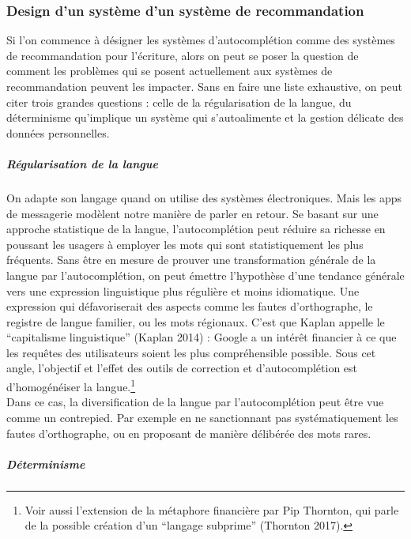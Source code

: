 \documentclass[]{article}
\let\oldsubparagraph\subparagraph
\renewcommand{\subparagraph}[1]{\oldsubparagraph{#1}\mbox{}}
\begin{document}
\hypertarget{design-dun-systuxe8me-dun-systuxe8me-de-recommandation}{%
\subsubsection{Design d'un système d'un système de
recommandation}\label{design-dun-systuxe8me-dun-systuxe8me-de-recommandation}}

Si l'on commence à désigner les systèmes d'autocomplétion comme des
systèmes de recommandation pour l'écriture, alors on peut se poser la
question de comment les problèmes qui se posent actuellement aux
systèmes de recommandation peuvent les impacter. Sans en faire une liste
exhaustive, on peut citer trois grandes questions : celle de la
régularisation de la langue, du déterminisme qu'implique un système qui
s'autoalimente et la gestion délicate des données personnelles.

\hypertarget{ruxe9gularisation-de-la-langue}{%
\subparagraph{Régularisation de la
langue}\label{ruxe9gularisation-de-la-langue}}

On adapte son langage quand on utilise des systèmes électroniques. Mais
les apps de messagerie modèlent notre manière de parler en retour. Se
basant sur une approche statistique de la langue, l'autocomplétion peut
réduire sa richesse en poussant les usagers à employer les mots qui sont
statistiquement les plus fréquents. Sans être en mesure de prouver une
transformation générale de la langue par l'autocomplétion, on peut
émettre l'hypothèse d'une tendance générale vers une expression
linguistique plus régulière et moins idiomatique. Une expression qui
défavoriserait des aspects comme les fautes d'orthographe, le registre
de langue familier, ou les mots régionaux. C'est que Kaplan appelle le
``capitalisme linguistique'' (Kaplan 2014) : Google a un intérêt
financier à ce que les requêtes des utilisateurs soient les plus
compréhensible possible. Sous cet angle, l'objectif et l'effet des
outils de correction et d'autocomplétion est d'homogénéiser la
langue.\footnote{Voir aussi l'extension de la métaphore financière par
  Pip Thornton, qui parle de la possible création d'un ``langage
  subprime'' (Thornton 2017).}\\
Dans ce cas, la diversification de la langue par l'autocomplétion peut
être vue comme un contrepied. Par exemple en ne sanctionnant pas
systématiquement les fautes d'orthographe, ou en proposant de manière
délibérée des mots rares.

\hypertarget{duxe9terminisme}{%
\subparagraph{Déterminisme}\label{duxe9terminisme}}
\end{document}
